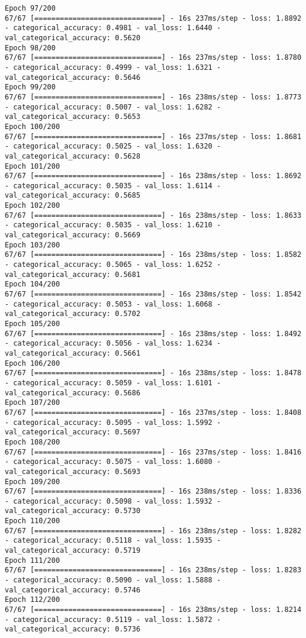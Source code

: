 \begin{lstlisting}
Epoch 97/200
67/67 [==============================] - 16s 237ms/step - loss: 1.8892 - categorical_accuracy: 0.4981 - val_loss: 1.6440 - val_categorical_accuracy: 0.5620
Epoch 98/200
67/67 [==============================] - 16s 237ms/step - loss: 1.8780 - categorical_accuracy: 0.4999 - val_loss: 1.6321 - val_categorical_accuracy: 0.5646
Epoch 99/200
67/67 [==============================] - 16s 238ms/step - loss: 1.8773 - categorical_accuracy: 0.5007 - val_loss: 1.6282 - val_categorical_accuracy: 0.5653
Epoch 100/200
67/67 [==============================] - 16s 237ms/step - loss: 1.8681 - categorical_accuracy: 0.5025 - val_loss: 1.6320 - val_categorical_accuracy: 0.5628
Epoch 101/200
67/67 [==============================] - 16s 238ms/step - loss: 1.8692 - categorical_accuracy: 0.5035 - val_loss: 1.6114 - val_categorical_accuracy: 0.5685
Epoch 102/200
67/67 [==============================] - 16s 238ms/step - loss: 1.8633 - categorical_accuracy: 0.5035 - val_loss: 1.6210 - val_categorical_accuracy: 0.5669
Epoch 103/200
67/67 [==============================] - 16s 238ms/step - loss: 1.8582 - categorical_accuracy: 0.5065 - val_loss: 1.6252 - val_categorical_accuracy: 0.5681
Epoch 104/200
67/67 [==============================] - 16s 238ms/step - loss: 1.8542 - categorical_accuracy: 0.5053 - val_loss: 1.6068 - val_categorical_accuracy: 0.5702
Epoch 105/200
67/67 [==============================] - 16s 238ms/step - loss: 1.8492 - categorical_accuracy: 0.5056 - val_loss: 1.6234 - val_categorical_accuracy: 0.5661
Epoch 106/200
67/67 [==============================] - 16s 238ms/step - loss: 1.8478 - categorical_accuracy: 0.5059 - val_loss: 1.6101 - val_categorical_accuracy: 0.5686
Epoch 107/200
67/67 [==============================] - 16s 237ms/step - loss: 1.8408 - categorical_accuracy: 0.5095 - val_loss: 1.5992 - val_categorical_accuracy: 0.5697
Epoch 108/200
67/67 [==============================] - 16s 237ms/step - loss: 1.8416 - categorical_accuracy: 0.5075 - val_loss: 1.6080 - val_categorical_accuracy: 0.5693
Epoch 109/200
67/67 [==============================] - 16s 238ms/step - loss: 1.8336 - categorical_accuracy: 0.5098 - val_loss: 1.5932 - val_categorical_accuracy: 0.5730
Epoch 110/200
67/67 [==============================] - 16s 238ms/step - loss: 1.8282 - categorical_accuracy: 0.5118 - val_loss: 1.5935 - val_categorical_accuracy: 0.5719
Epoch 111/200
67/67 [==============================] - 16s 238ms/step - loss: 1.8283 - categorical_accuracy: 0.5090 - val_loss: 1.5888 - val_categorical_accuracy: 0.5746
Epoch 112/200
67/67 [==============================] - 16s 238ms/step - loss: 1.8214 - categorical_accuracy: 0.5119 - val_loss: 1.5872 - val_categorical_accuracy: 0.5736

\end{lstlisting}
